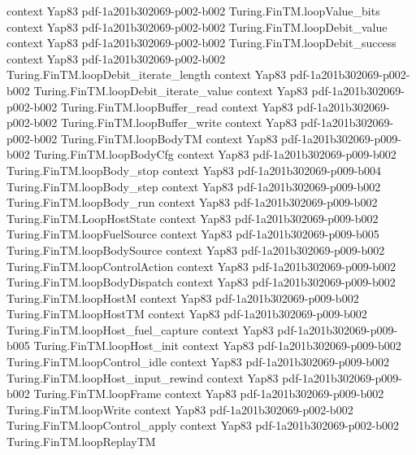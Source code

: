 \begin{theorem}
  {context}
  {Yap83}
  {pdf-1a201b302069-p002-b002}
\proofstep
  {Turing.FinTM.loopValue_bits}
  {context}
  {Yap83}
  {pdf-1a201b302069-p002-b002}
\proofstep
  {Turing.FinTM.loopDebit_value}
  {context}
  {Yap83}
  {pdf-1a201b302069-p002-b002}
\proofstep
  {Turing.FinTM.loopDebit_success}
  {context}
  {Yap83}
  {pdf-1a201b302069-p002-b002}
\proofstep
  {Turing.FinTM.loopDebit_iterate_length}
  {context}
  {Yap83}
  {pdf-1a201b302069-p002-b002}
\proofstep
  {Turing.FinTM.loopDebit_iterate_value}
  {context}
  {Yap83}
  {pdf-1a201b302069-p002-b002}
\proofstep
  {Turing.FinTM.loopBuffer_read}
  {context}
  {Yap83}
  {pdf-1a201b302069-p002-b002}
\proofstep
  {Turing.FinTM.loopBuffer_write}
  {context}
  {Yap83}
  {pdf-1a201b302069-p002-b002}
\proofstep
  {Turing.FinTM.loopBodyTM}
  {context}
  {Yap83}
  {pdf-1a201b302069-p009-b002}
\proofstep
  {Turing.FinTM.loopBodyCfg}
  {context}
  {Yap83}
  {pdf-1a201b302069-p009-b002}
\proofstep
  {Turing.FinTM.loopBody_stop}
  {context}
  {Yap83}
  {pdf-1a201b302069-p009-b004}
\proofstep
  {Turing.FinTM.loopBody_step}
  {context}
  {Yap83}
  {pdf-1a201b302069-p009-b002}
\proofstep
  {Turing.FinTM.loopBody_run}
  {context}
  {Yap83}
  {pdf-1a201b302069-p009-b002}
\proofstep
  {Turing.FinTM.LoopHostState}
  {context}
  {Yap83}
  {pdf-1a201b302069-p009-b002}
\proofstep
  {Turing.FinTM.loopFuelSource}
  {context}
  {Yap83}
  {pdf-1a201b302069-p009-b005}
\proofstep
  {Turing.FinTM.loopBodySource}
  {context}
  {Yap83}
  {pdf-1a201b302069-p009-b002}
\proofstep
  {Turing.FinTM.loopControlAction}
  {context}
  {Yap83}
  {pdf-1a201b302069-p009-b002}
\proofstep
  {Turing.FinTM.loopBodyDispatch}
  {context}
  {Yap83}
  {pdf-1a201b302069-p009-b002}
\proofstep
  {Turing.FinTM.loopHostM}
  {context}
  {Yap83}
  {pdf-1a201b302069-p009-b002}
\proofstep
  {Turing.FinTM.loopHostTM}
  {context}
  {Yap83}
  {pdf-1a201b302069-p009-b002}
\proofstep
  {Turing.FinTM.loopHost_fuel_capture}
  {context}
  {Yap83}
  {pdf-1a201b302069-p009-b005}
\proofstep
  {Turing.FinTM.loopHost_init}
  {context}
  {Yap83}
  {pdf-1a201b302069-p009-b002}
\proofstep
  {Turing.FinTM.loopControl_idle}
  {context}
  {Yap83}
  {pdf-1a201b302069-p009-b002}
\proofstep
  {Turing.FinTM.loopHost_input_rewind}
  {context}
  {Yap83}
  {pdf-1a201b302069-p009-b002}
\proofstep
  {Turing.FinTM.loopFrame}
  {context}
  {Yap83}
  {pdf-1a201b302069-p009-b002}
\proofstep
  {Turing.FinTM.loopWrite}
  {context}
  {Yap83}
  {pdf-1a201b302069-p002-b002}
\proofstep
  {Turing.FinTM.loopControl_apply}
  {context}
  {Yap83}
  {pdf-1a201b302069-p002-b002}
\proofstep
  {Turing.FinTM.loopReplayTM}

\end{theorem}
